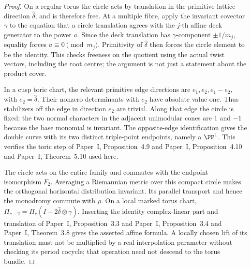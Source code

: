 \begin{proof}
On a regular torus the circle acts by translation in the primitive
lattice direction $\widehat\delta$, and is therefore free.
At a multiple fibre, apply the invariant covector $\gamma$ to the
equation that a circle translation agrees with the $j$-th affine
deck generator to the power $a$. Since the deck translation has
$\gamma$-component $\pm1/m_j$, equality forces
$a\equiv0\pmod{m_j}$. Primitivity of $\widehat\delta$ then
forces the circle element to be the identity. This checks freeness
on the quotient using the actual twist vectors, including the root
centre; the argument is not just a statement about the product cover.

In a cusp toric chart, the relevant primitive edge directions are
$e_1,e_2,e_1-e_2$, with $e_2=\widehat\delta$.
Their nonzero determinants with $e_2$ have absolute value one.
Thus stabilizers off the edge in direction $e_2$ are trivial. Along
that edge the circle is fixed; the two normal characters in the
adjacent unimodular cones are $1$ and $-1$ because the base monomial
is invariant. The opposite-edge identification gives the double
curve with its two distinct triple-point endpoints, namely a
$\PP^1$. This verifies the toric step of Paper~I, Proposition~4.9 and Paper~I, Proposition~4.10 and Paper~I, Theorem~5.10 used here.

The circle acts on the entire family and commutes with the endpoint
isomorphism $F_2$. Averaging a Riemannian metric over this compact
circle makes the orthogonal horizontal distribution invariant.
Its parallel transport and hence the monodromy commute with $\rho$.
On a local marked torus chart,
$\Pi_{c-2}=\Pi_c(I-2\widehat\delta\otimes\gamma)$.
Inserting the identity complex-linear part and translation of Paper~I, Proposition~3.3 and Paper~I, Proposition~3.4 and Paper~I, Theorem~3.8
gives the asserted affine formula. A locally chosen lift of its
translation must not be multiplied by a real interpolation parameter
without checking its period cocycle; that operation need not descend
to the torus bundle.
\end{proof}


